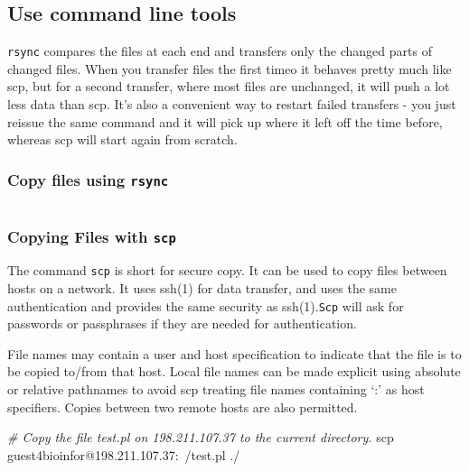 \documentclass[]{book}
\makeatletter
\newenvironment{Shaded}{\begin{snugshade}}{\end{snugshade}}
\newcommand{\CommentTok}[1]{\textcolor[rgb]{0.56,0.35,0.01}{\textit{#1}}}
\newcommand{\FunctionTok}[1]{\textcolor[rgb]{0.00,0.00,0.00}{#1}}
\newcommand{\NormalTok}[1]{#1}
\newenvironment{kframe}{%
\medskip{}
\setlength{\fboxsep}{.8em}
 \def\at@end@of@kframe{}%
 \ifinner\ifhmode%
  \def\at@end@of@kframe{\end{minipage}}%
  \begin{minipage}{\columnwidth}%
 \fi\fi%
 \def\FrameCommand##1{\hskip\@totalleftmargin \hskip-\fboxsep
 \colorbox{shadecolor}{##1}\hskip-\fboxsep
     \hskip-\linewidth \hskip-\@totalleftmargin \hskip\columnwidth}%
 \MakeFramed {\advance\hsize-\width
   \@totalleftmargin\z@ \linewidth\hsize
   \@setminipage}}%
 {\par\unskip\endMakeFramed%
 \at@end@of@kframe}
\renewenvironment{Shaded}{\begin{kframe}}{\end{kframe}}
\makeatother
\begin{document}
\hypertarget{use-command-line-tools}{%
\subsection{Use command line tools}\label{use-command-line-tools}}

\texttt{rsync} compares the files at each end and transfers only the changed parts of changed files. When you transfer files the first timeo it behaves pretty much like scp, but for a second transfer, where most files are unchanged, it will push a lot less data than scp. It's also a convenient way to restart failed transfers - you just reissue the same command and it will pick up where it left off the time before, whereas scp will start again from scratch.

\hypertarget{copy-files-using-rsync}{%
\subsubsection{\texorpdfstring{Copy files using \texttt{rsync}}{Copy files using rsync}}\label{copy-files-using-rsync}}

\begin{verbatim}
\end{verbatim}

\hypertarget{copying-files-with-scp}{%
\subsubsection{\texorpdfstring{Copying Files with \texttt{scp}}{Copying Files with scp}}\label{copying-files-with-scp}}

The command \texttt{scp} is short for secure copy. It can be used to copy files between hosts on a network. It uses ssh(1) for data transfer, and uses the same authentication and provides the same security as ssh(1).\texttt{Scp} will ask for passwords or passphrases if they are needed for authentication.

File names may contain a user and host specification to indicate that the file is to be copied to/from that host. Local file names can be made explicit using absolute or relative pathnames to avoid scp treating file names containing `:' as host specifiers. Copies between two remote hosts are also permitted.

\begin{Shaded}
\begin{Highlighting}[]
\CommentTok{# Copy the file test.pl on 198.211.107.37 to the current directory.}
\FunctionTok{scp}\NormalTok{ guest4bioinfor@198.211.107.37:~/test.pl ./}
\end{Highlighting}
\end{Shaded}
\end{document}
